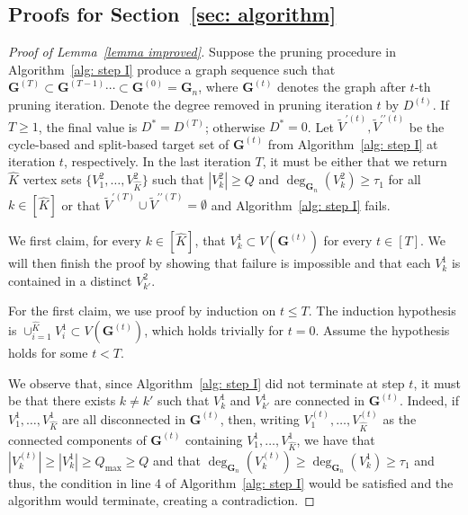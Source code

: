 \documentclass[twoside,11pt]{article}
\theoremstyle{remark}
\begin{document}
\subsection{Proofs for Section~\ref{sec: algorithm}}
\begin{proof}[Proof of Lemma~\ref{lemma improved}]
Suppose the pruning procedure in Algorithm~\ref{alg: step I} produce a graph sequence such that $\bm{G}^{(T)}\subset \bm{G}^{(T-1)} \cdots \subset \bm{G}^{(0)}=\bm{G}_n$, where $\bm{G}^{(t)}$ denotes the graph after $t$-th pruning iteration.
Denote the degree removed in pruning iteration $t$ by $D^{(t)}$. If $T\geq1$, the final value is $D^*=D^{(T)}$; otherwise $D^*=0$.
Let $\tilde{V}^{\prime(t)}, \tilde{V}^{\prime \prime(t)}$ be the cycle-based and split-based target set of $\bm{G}^{(t)}$ from Algorithm~\ref{alg: step I} at iteration $t$, respectively. In the last iteration $T$, it must be either that we return $\hat{K}$ vertex sets $\{V_1^2, \ldots, V_{\hat{K}}^2\}$ such that $| V_k^2| \geq Q$ and $\operatorname{deg}_{\bm{G}_n}(V^2_k) \geq \tau_1$ for all $k \in [\hat{K}]$ or that $\tilde{V}^{\prime (T)}\cup\tilde{V}^{\prime \prime(T)}=\emptyset$ and Algorithm~\ref{alg: step I} fails.

We first claim, for every $k \in [\hat{K}]$, that $V^1_k \subset V(\bm{G}^{(t)})$ for every $t \in [T]$. We will then finish the proof by showing that failure is impossible and that each $V^1_k$ is contained in a distinct $V^2_{k'}$. 


For the first claim, we use proof by induction on $t\le T$. 
The induction hypothesis is $\cup_{i=1}^{\hat{K}} V^1_i \subset V(\bm{G}^{(t)})$, which holds trivially for $t=0$.
Assume the hypothesis holds for some $t<T$.

We observe that, since Algorithm~\ref{alg: step I} did not terminate at step $t$, it must be that there exists $k \neq k'$ such that $V^1_k$ and $V^1_{k'}$ are connected in $\bm{G}^{(t)}$. Indeed, if $V^1_1, \ldots, V^1_{\hat{K}}$ are all disconnected in $\bm{G}^{(t)}$, then, writing $V^{(t)}_1, \ldots, V^{(t)}_{\hat{K}}$ as the connected components of $\bm{G}^{(t)}$ containing $V_1^1, \ldots, V^1_{\hat{K}}$, we have that $|V^{(t)}_k| \geq |V^1_k| \geq Q_{\max}\geq Q$ and that $\operatorname{deg}_{\bm{G}_n}(V^{(t)}_k) \geq \operatorname{deg}_{\bm{G}_n}(V^1_k) \geq \tau_1$ and thus, the condition in line 4 of Algorithm~\ref{alg: step I} would be satisfied and the algorithm would terminate, creating a contradiction. 


\end{proof}
\end{document}
